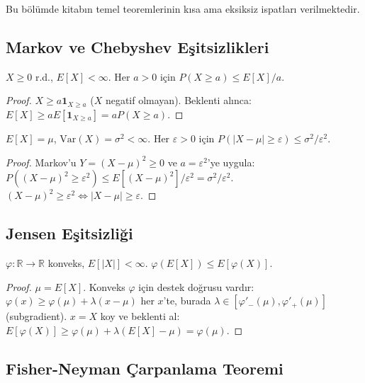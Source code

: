 Bu bölümde kitabın temel teoremlerinin kısa ama eksiksiz ispatları verilmektedir.

\subsection{Markov ve Chebyshev Eşitsizlikleri}

\begin{teorem}
$X\geq0$ r.d., $E[X]<\infty$. Her $a>0$ için $P(X\geq a)\leq E[X]/a$.
\end{teorem}
\begin{proof}
$X\geq a\mathbf{1}_{X\geq a}$ ($X$ negatif olmayan). Beklenti alınca: $E[X]\geq aE[\mathbf{1}_{X\geq a}]=aP(X\geq a)$.
\end{proof}

\begin{teorem}
$E[X]=\mu$, $\mathrm{Var}(X)=\sigma^2<\infty$. Her $\varepsilon>0$ için $P(|X-\mu|\geq\varepsilon)\leq\sigma^2/\varepsilon^2$.
\end{teorem}
\begin{proof}
Markov'u $Y=(X-\mu)^2\geq0$ ve $a=\varepsilon^2$'ye uygula: $P((X-\mu)^2\geq\varepsilon^2)\leq E[(X-\mu)^2]/\varepsilon^2=\sigma^2/\varepsilon^2$. $(X-\mu)^2\geq\varepsilon^2\iff|X-\mu|\geq\varepsilon$.
\end{proof}

\subsection{Jensen Eşitsizliği}

\begin{teorem}
$\varphi:\mathbb{R}\to\mathbb{R}$ konveks, $E[|X|]<\infty$. $\varphi(E[X])\leq E[\varphi(X)]$.
\end{teorem}
\begin{proof}
$\mu=E[X]$. Konveks $\varphi$ için destek doğrusu vardır: $\varphi(x)\geq\varphi(\mu)+\lambda(x-\mu)$ her $x$'te, burada $\lambda\in[\varphi'_-(\mu),\varphi'_+(\mu)]$ (subgradient). $x=X$ koy ve beklenti al: $E[\varphi(X)]\geq\varphi(\mu)+\lambda(E[X]-\mu)=\varphi(\mu)$.
\end{proof}

\subsection{Fisher-Neyman Çarpanlama Teoremi}

